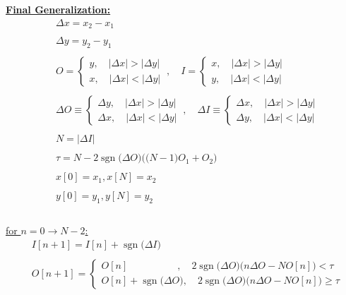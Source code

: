 \documentclass{article}
\DeclareMathOperator{\sgn}{sgn}
\begin{document}
\underline{\textbf{Final Generalization:}}
\begin{align*}
    &\Delta x = x_{2} - x_{1} \\ \\
    &\Delta y = y_{2} - y_{1} \\ \\
    &O = \begin{cases}
            y, \quad |\Delta x| > |\Delta y| \\
            x, \quad |\Delta x| < |\Delta y|
           \end{cases} \ , \quad
     I = \begin{cases}
            x, \quad |\Delta x| > |\Delta y| \\
            y, \quad |\Delta x| < |\Delta y| 
           \end{cases} \\ \\
    &\Delta O \equiv \begin{cases}
                        \Delta y, \quad |\Delta x| > |\Delta y| \\
                        \Delta x, \quad |\Delta x| < |\Delta y| 
                       \end{cases} \ , \quad
     \Delta I \equiv \begin{cases}
                        \Delta x, \quad |\Delta x| > |\Delta y| \\
                        \Delta y, \quad |\Delta x| < |\Delta y| 
                       \end{cases} \\ \\ 
    &N = |\Delta I| \\ \\  
    &\tau = N - 2\sgn\big(\Delta O\big)\bigg(\big(N - 1\big)O_{1} + O_{2}\bigg) \\ \\
    &x[0] = x_{1}, x[N] = x_{2} \\ \\
    &y[0] = y_{1}, y[N] = y_{2} \\ \\
\end{align*}

\underline{for $n = 0 \rightarrow N - 2$:}
\begin{align*}
    &I[n + 1] = I[n] + \sgn\big(\Delta I\big) \\ \\ 
    &O[n + 1] = \begin{cases}
                    O[n] \quad \quad \quad \quad \quad, \quad 2\sgn\big(\Delta O\big)\Bigg(n\Delta O - NO[n] \Bigg) < \tau \\
                    O[n] + \sgn\big(\Delta O\big), \quad 2\sgn\big(\Delta O\big)\Bigg(n\Delta O - NO[n] \Bigg) \geq \tau
                  \end{cases} \\ \\ 
\end{align*}
\end{document}
